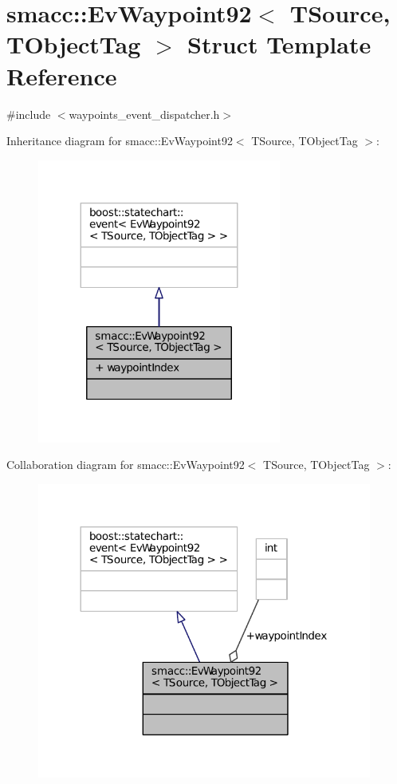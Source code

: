 \hypertarget{structsmacc_1_1EvWaypoint92}{}\section{smacc\+:\+:Ev\+Waypoint92$<$ T\+Source, T\+Object\+Tag $>$ Struct Template Reference}
\label{structsmacc_1_1EvWaypoint92}


{\ttfamily \#include $<$waypoints\+\_\+event\+\_\+dispatcher.\+h$>$}



Inheritance diagram for smacc\+:\+:Ev\+Waypoint92$<$ T\+Source, T\+Object\+Tag $>$\+:
\nopagebreak
\begin{figure}[H]
\begin{center}
\leavevmode
\includegraphics[width=227pt]{structsmacc_1_1EvWaypoint92__inherit__graph}
\end{center}
\end{figure}


Collaboration diagram for smacc\+:\+:Ev\+Waypoint92$<$ T\+Source, T\+Object\+Tag $>$\+:
\nopagebreak
\begin{figure}[H]
\begin{center}
\leavevmode
\includegraphics[width=312pt]{structsmacc_1_1EvWaypoint92__coll__graph}
\end{center}
\end{figure}
